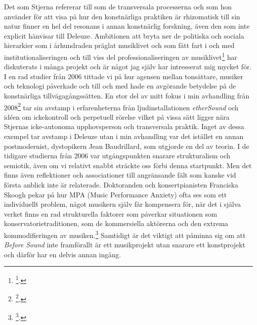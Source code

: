 \documentclass[11pt]{article}
\begin{document}
Det som Stjerna refererar till som de transversala processerna och som
hon använder för att visa på hur den konstnärliga praktiken är
rhizomatisk till sin natur finner en hel del resonans i annan
konstnärlig forskning, även den som inte explicit hänvisar till Deleuze.
Ambitionen att bryta ner de politiska och sociala hierarkier som i
århundraden präglat musiklivet och som fått fart i och med
institutionaliseringen och till viss del professionaliseringen av
musiklivet\footnote{\footcite{frisk2016b}.} har diskuterats i många projekt och är något jag själv
har intresserat mig mycket för. I en rad studier från 2006 tittade vi på
hur agensen mellan tonsättare, musiker och teknologi påverkade och till
och med hade en avgörande betydelse på de konstnärliga
tillvägagångssätten. En stor del av mitt fokus i min avhandling från
2008\footnote{\footcite{frisk08phd}.} tar sin avstamp i erfarenheterna från ljudinstallationen
\emph{etherSound} och idéen om ickekontroll och perpetuell rörelse vilket på
vissa sätt ligger nära Stjernas icke-autonoma upphovsperson och
transversala praktik. Inget av dessa exempel tar avstamp i Deleuze utan
i min avhandling var det istället en annan postmodernist, dystopikern
Jean Baudrillard, som utgjorde en del av teorin. I de tidigare studierna
från 2006 var utgångspunkten snarare strukturalism och semiotik, även om
vi relativt snabbt sträckte oss förbi denna startpunkt. Men det finns
även reflektioner och associationer till angränsande fält som kanske vid
första anblick inte är relaterade. Doktoranden och konsertpianisten
Franciska Skoogh pekar på hur MPA (Music Performance Anxiety) ofta ses
som ett individuellt problem, något musikern själv får kompensera för,
när det i själva verket finns en rad strukturella faktorer som påverkar
situationen som konservatorietraditionen, som de kommersiella aktörerna
och den extrema kommodifieringen av musiken.\footnote{\footcite{frisk2019}.} Samtidigt är det
viktigt att påminna sig om att \emph{Before Sound} inte framförallt är ett
musikprojekt utan snarare ett konstprojekt och därför har en delvis
annan ingång.
\end{document}

